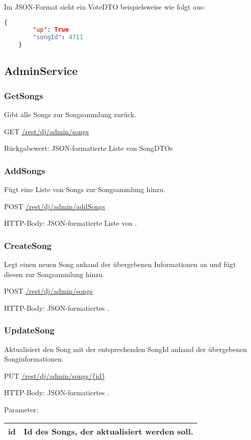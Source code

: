 Im JSON-Format sieht ein VoteDTO beispielsweise wie folgt aus:

\begin{lstlisting}[language=json]
    {
        "up": True
        "songId": 4711
    }
\end{lstlisting}

\subsection{AdminService}

\subsubsection{GetSongs}
\label{service:GetSongs}
Gibt alle Songs zur Songsammlung zurück.

GET
\url{/rest/dj/admin/songs}

Rückgabewert: JSON-formatierte Liste von SongDTOs 


\subsubsection{AddSongs}
\label{service:AddSongs}
Fügt eine Liste von Songs zur Songsammlung hinzu.

POST
\url{/rest/dj/admin/addSongs}

HTTP-Body: JSON-formatierte Liste von .

\subsubsection{CreateSong}
\label{service:CreateSong}
Legt einen neuen Song anhand der übergebenen Informationen an und fügt diesen zur Songsammlung hinzu.

POST
\url{/rest/dj/admin/songs}

HTTP-Body: JSON-formatiertes .


\subsubsection{UpdateSong}
\label{service:UpdateSong}
Aktualisiert den Song mit der entsprechenden SongId anhand der übergebenen Songinformationen.

PUT
\url{/rest/dj/admin/songs/{id}}

HTTP-Body: JSON-formatiertes .

Parameter:\\
\begin{tabularx}{\textwidth}{|l|X|}
\hline id & Id des Songs, der aktualisiert werden soll. \\ 
\hline 
\end{tabularx}

